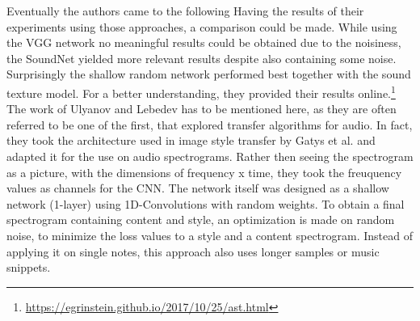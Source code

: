 Eventually the authors came to the following
Having the results of their experiments using those approaches, a comparison could be made. While using the VGG network no meaningful results could be obtained due to the noisiness, the SoundNet yielded more relevant results despite also containing some noise. Surprisingly the shallow random network performed best together with the sound texture model. For a better understanding, they provided their results online.\footnote{\url{https://egrinstein.github.io/2017/10/25/ast.html}}\\

The work of Ulyanov and Lebedev has to be mentioned here, as they are often referred to be one of the first, that explored transfer algorithms for audio. \cite{ulyanov2016audio} In fact, they took the architecture used in image style transfer by Gatys et al. and adapted it for the use on audio spectrograms. Rather then seeing the spectrogram as a picture, with the dimensions of frequency x time, they took the freuquency values as channels for the CNN. The network itself was designed as a shallow network (1-layer) using 1D-Convolutions with random weights. To obtain a final spectrogram containing content and style, an optimization is made on random noise, to minimize the loss values to a style and a content spectrogram. Instead of applying it on single notes, this approach also uses longer samples or music snippets. 

